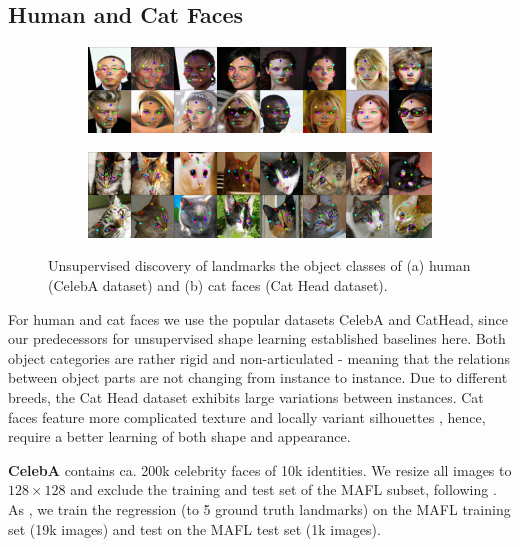 	\subsection{Human and Cat Faces}\label{sec:kp_faces}
		\begin{figure}[htp]
			\centering
			\begin{subfigure}{1.\textwidth}
			\includegraphics[trim={0cm 0cm 0cm 0cm},clip, width=1.\linewidth]{fig/shape/0celeba}\caption{}
			\end{subfigure}
			\begin{subfigure}{1.\textwidth}
			\includegraphics[trim={0cm 0cm 0cm 0cm},clip, width=1.\linewidth]{fig/shape/0cats}\caption{}
			\end{subfigure}
			\caption{{Unsupervised discovery of landmarks the object classes of (a) human (CelebA dataset) and (b) cat faces (Cat Head dataset).}}
			\label{fig:kp_faces}
		\end{figure}

		For human and cat faces we use the popular datasets CelebA and CatHead, since our predecessors for unsupervised shape learning established baselines here. Both object categories are rather rigid and non-articulated - meaning that the relations between object parts are not changing from instance to instance.
		Due to different breeds, the Cat Head dataset exhibits large variations between instances. Cat faces feature more complicated texture and locally variant silhouettes \cite{zhang08cathead}, hence, require a better learning of both shape and appearance.

			\begin{tcolorbox}
				\textbf{CelebA} \cite{liu15facewild} contains ca. 200k celebrity faces of 10k identities.
				We resize all images to $128\times 128$ and exclude the training and test set of the MAFL subset, following \cite{thewlis17}.
				As  \cite{thewlis17, zhang18}, we train the regression (to 5 ground truth landmarks) on the MAFL training set (19k images) and test on the MAFL test set (1k images).
			\end{tcolorbox}

